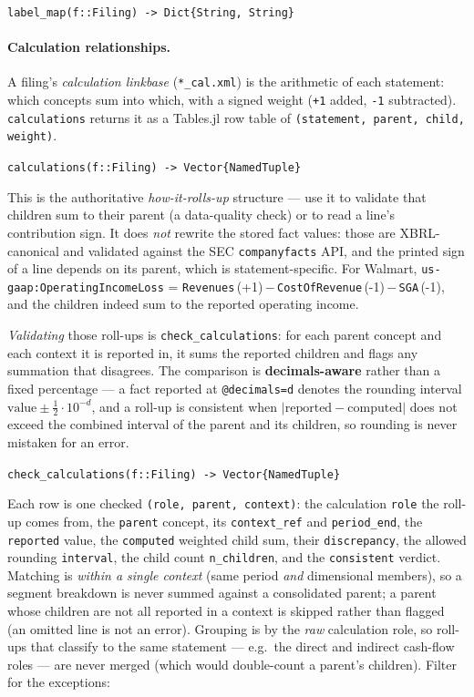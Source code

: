 \documentclass[11pt,a4paper]{report}
\newcommand{\sig}[1]{\medskip\noindent\texttt{#1}\par\medskip}
\begin{document}
\sig{label\_map(f::Filing) -> Dict\{String, String\}}

\paragraph{Calculation relationships.}\label{sec:api-calc} A filing's \emph{calculation linkbase}
(\texttt{*\_cal.xml}) is the arithmetic of each statement: which concepts sum into which, with
a signed weight (\texttt{+1} added, \texttt{-1} subtracted). \texttt{calculations} returns it as
a Tables.jl row table of \texttt{(statement, parent, child, weight)}.

\sig{calculations(f::Filing) -> Vector\{NamedTuple\}}

\noindent This is the authoritative \emph{how-it-rolls-up} structure --- use it to validate that
children sum to their parent (a data-quality check) or to read a line's contribution sign. It
does \emph{not} rewrite the stored fact values: those are XBRL-canonical and validated against the
SEC \texttt{companyfacts} API, and the printed sign of a line depends on its parent, which is
statement-specific. For Walmart, \texttt{us-gaap:OperatingIncomeLoss} =
\texttt{Revenues}\,(+1)\,$-$\,\texttt{CostOfRevenue}\,(-1)\,$-$\,\texttt{SGA}\,(-1), and the
children indeed sum to the reported operating income.

\noindent \emph{Validating} those roll-ups is \texttt{check\_calculations}: for each parent concept
and each context it is reported in, it sums the reported children and flags any summation that
disagrees. The comparison is \textbf{decimals-aware} rather than a fixed percentage --- a fact
reported at \texttt{@decimals=d} denotes the rounding interval $\mathrm{value}\pm\frac{1}{2}\cdot
10^{-d}$, and a roll-up is consistent when $|\mathrm{reported}-\mathrm{computed}|$ does not exceed the
combined interval of the parent and its children, so rounding is never mistaken for an error.

\sig{check\_calculations(f::Filing) -> Vector\{NamedTuple\}}

\noindent Each row is one checked \texttt{(role, parent, context)}: the calculation \texttt{role} the
roll-up comes from, the \texttt{parent} concept, its \texttt{context\_ref} and \texttt{period\_end}, the
\texttt{reported} value, the \texttt{computed} weighted child sum, their \texttt{discrepancy}, the allowed
rounding \texttt{interval}, the child count \texttt{n\_children}, and the \texttt{consistent} verdict.
Matching is \emph{within a single context} (same period \emph{and} dimensional members), so a segment
breakdown is never summed against a consolidated parent; a parent whose children are not all reported in a
context is skipped rather than flagged (an omitted line is not an error). Grouping is by the \emph{raw}
calculation role, so roll-ups that classify to the same statement --- e.g.\ the direct and indirect
cash-flow roles --- are never merged (which would double-count a parent's children). Filter for the
exceptions:
\end{document}
